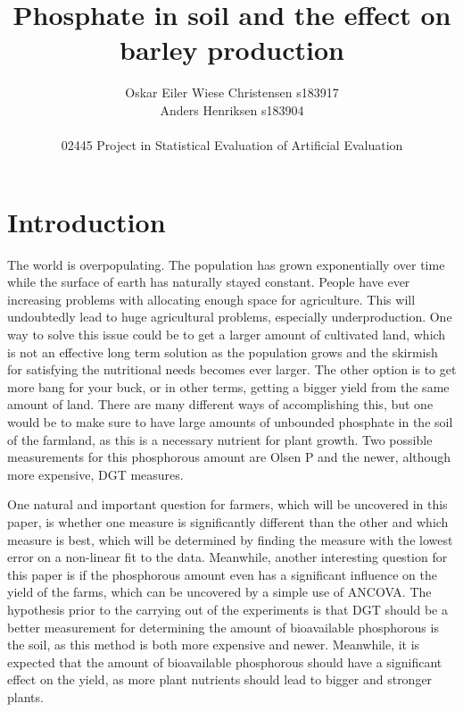 \documentclass[11pt, fleqn, titlepage]{article}
\title{Phosphate in soil and the effect on barley production}
\author{Oskar Eiler Wiese Christensen s183917 \\ Anders Henriksen s183904 \\ \\ 02445 Project in Statistical Evaluation of Artificial Evaluation}
\date{\today \vspace{2.5cm} \section*{\small Summary} 
\justify{\footnotesize Farmers will need more effective agriculture as the population grows. This can be accomplished by optimizing the amount of bioavailable phosphorous in the soil. The purpose of this paper is to analyze two different measurements of phosphorous in the soil. The measurements are OlsenP and DGT. Furthermore, it is studied which measurement is better at describing the yield. A linear and non-linear Michaelis-Mentel model have been fit to the data to find the best possible measurement to use, and ANCOVA has been applied for finding the significance of phosphorous for the yield. These analyses have shown that DGT is the best of the two measurements and that phosphorous has a remarkably significant influence on the harvest yield. This shows that phosphorous measurements can be constructive in helping farmers estimate the yield. Meanwhile, when estimating this, DGT is the better of the measurements, though it also costs more, so farmers should take into consideration the cost-benefit of using DGT instead of OlsenP.}}
\begin{document}
\maketitle

\section{Introduction}
The world is overpopulating. The population has grown exponentially over time while the surface of earth has naturally stayed constant. People have ever increasing problems with allocating enough space for agriculture. This will undoubtedly lead to huge agricultural problems, especially underproduction. One way to solve this issue could be to get a larger amount of cultivated land, which is not an effective long term solution as the population grows and the skirmish for satisfying the nutritional needs becomes ever larger. The other option is to get more bang for your buck, or in other terms, getting a bigger yield from the same amount of land. There are many different ways of accomplishing this, but one would be to make sure to have large amounts of unbounded phosphate in the soil of the farmland, as this is a necessary nutrient for plant growth. Two possible measurements for this phosphorous amount are Olsen P and the newer, although more expensive, DGT measures. 

One natural and important question for farmers, which will be uncovered in this paper, is whether one measure is significantly different than the other and which measure is best, which will be determined by finding the measure with the lowest error on a non-linear fit to the data. Meanwhile, another interesting question for this paper is if the phosphorous amount even has a significant influence on the yield of the farms, which can be uncovered by a simple use of ANCOVA. The hypothesis prior to the carrying out of the experiments is that DGT should be a better measurement for determining the amount of bioavailable phosphorous is the soil, as this method is both more expensive and newer. Meanwhile, it is expected that the amount of bioavailable phosphorous should have a significant effect on the yield, as more plant nutrients should lead to bigger and stronger plants.
\end{document}
